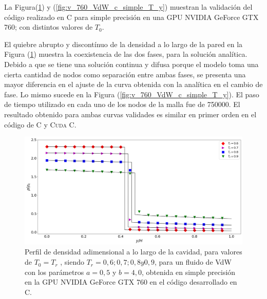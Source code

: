 La Figura(\ref{fig:v_760_VdW_c_simple_rho_y}) y (\ref{fig:v_760_VdW_c_simple_T_y})  muestran la validación del código realizado en \textsc{C} para simple precisión en una GPU NVIDIA GeForce GTX 760; con distintos valores de $T_0$. 

El quiebre abrupto y discontínuo de la densidad a lo largo de la pared en la Figura (\ref{fig:v_760_VdW_c_simple_rho_y}) muestra la coexistencia de las dos fases, para la solución analítica. Debido a que se tiene una solución continua y difusa porque el modelo toma una cierta cantidad de nodos como separación entre ambas fases, se presenta una mayor diferencia en el ajuste de la curva obtenida con la analítica en el cambio de fase. Lo mismo sucede en la Figura (\ref{fig:v_760_VdW_c_simple_T_y}). El paso de tiempo utilizado en cada uno de los nodos de la malla fue de 750000. El resultado obtenido para ambas curvas validades es similar en primer orden en el código de \textsc{C} y \textsc{Cuda C}.

\begin{figure}[h!]
	\centering
	\includegraphics[width=\textwidth]{figs/cap4/v_760_VdW_c_simple_rho_y}
	\caption{Perfil de densidad adimensional a lo largo de la cavidad, para valores de $T_0 = T_r$ , siendo $T_r = 0,6 ; 0,7 ; 0,8 y 0,9$, para un fluido de VdW con los parámetros $a = 0,5 $ y $b = 4,0 $, obtenida en simple precisión en la GPU NVIDIA GeForce GTX 760 en el código desarrollado en \textsc{C}.}
	\label{fig:v_760_VdW_c_simple_rho_y}	
\end{figure}

